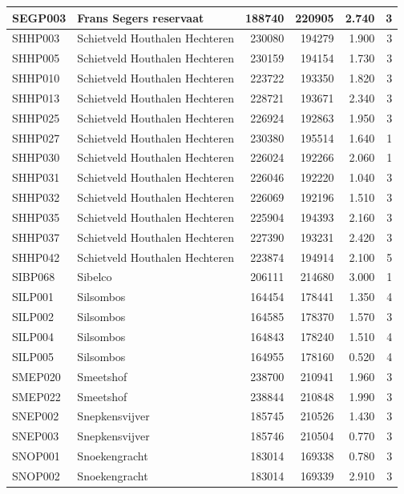 \documentclass[11pt,]{book}
\begin{document}
\begin{table}
\begin{tabular}[t]{l|l|r|r|r|r}
\hline
SEGP003 & Frans Segers reservaat & 188740 & 220905 & 2.740 & 3\\
\hline
SHHP003 & Schietveld Houthalen Hechteren & 230080 & 194279 & 1.900 & 3\\
\hline
SHHP005 & Schietveld Houthalen Hechteren & 230159 & 194154 & 1.730 & 3\\
\hline
SHHP010 & Schietveld Houthalen Hechteren & 223722 & 193350 & 1.820 & 3\\
\hline
SHHP013 & Schietveld Houthalen Hechteren & 228721 & 193671 & 2.340 & 3\\
\hline
SHHP025 & Schietveld Houthalen Hechteren & 226924 & 192863 & 1.950 & 3\\
\hline
SHHP027 & Schietveld Houthalen Hechteren & 230380 & 195514 & 1.640 & 1\\
\hline
SHHP030 & Schietveld Houthalen Hechteren & 226024 & 192266 & 2.060 & 1\\
\hline
SHHP031 & Schietveld Houthalen Hechteren & 226046 & 192220 & 1.040 & 3\\
\hline
SHHP032 & Schietveld Houthalen Hechteren & 226069 & 192196 & 1.510 & 3\\
\hline
SHHP035 & Schietveld Houthalen Hechteren & 225904 & 194393 & 2.160 & 3\\
\hline
SHHP037 & Schietveld Houthalen Hechteren & 227390 & 193231 & 2.420 & 3\\
\hline
SHHP042 & Schietveld Houthalen Hechteren & 223874 & 194914 & 2.100 & 5\\
\hline
SIBP068 & Sibelco & 206111 & 214680 & 3.000 & 1\\
\hline
SILP001 & Silsombos & 164454 & 178441 & 1.350 & 4\\
\hline
SILP002 & Silsombos & 164585 & 178370 & 1.570 & 3\\
\hline
SILP004 & Silsombos & 164843 & 178240 & 1.510 & 4\\
\hline
SILP005 & Silsombos & 164955 & 178160 & 0.520 & 4\\
\hline
SMEP020 & Smeetshof & 238700 & 210941 & 1.960 & 3\\
\hline
SMEP022 & Smeetshof & 238844 & 210848 & 1.990 & 3\\
\hline
SNEP002 & Snepkensvijver & 185745 & 210526 & 1.430 & 3\\
\hline
SNEP003 & Snepkensvijver & 185746 & 210504 & 0.770 & 3\\
\hline
SNOP001 & Snoekengracht & 183014 & 169338 & 0.780 & 3\\
\hline
SNOP002 & Snoekengracht & 183014 & 169339 & 2.910 & 3\\

\end{tabular}
\end{table}
\end{document}
